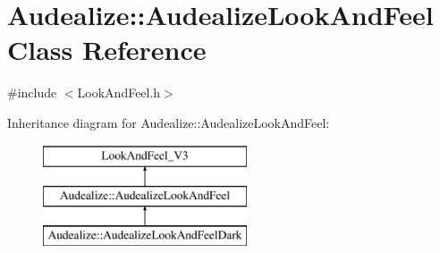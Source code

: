 \hypertarget{class_audealize_1_1_audealize_look_and_feel}{}\section{Audealize\+:\+:Audealize\+Look\+And\+Feel Class Reference}
\label{class_audealize_1_1_audealize_look_and_feel}


{\ttfamily \#include $<$Look\+And\+Feel.\+h$>$}

Inheritance diagram for Audealize\+:\+:Audealize\+Look\+And\+Feel\+:\begin{figure}[H]
\begin{center}
\leavevmode
\includegraphics[height=3.000000cm]{class_audealize_1_1_audealize_look_and_feel}
\end{center}
\end{figure}
